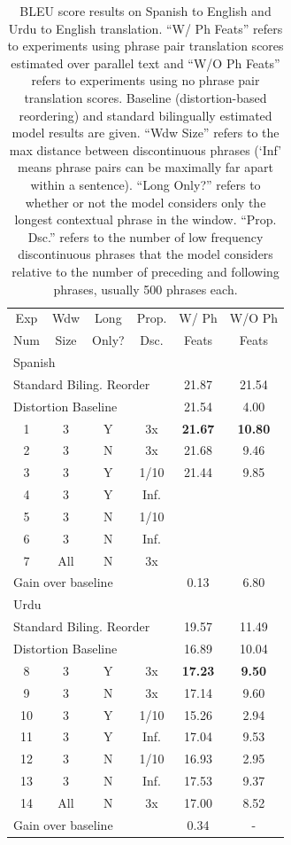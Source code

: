 \documentclass[11pt,letterpaper]{article}
\begin{document}
\begin{table}[t]
\begin{smaller}
\begin{center}
\begin{tabular}{|c|c|c|c|c|c|}
\hline
Exp & Wdw & Long & Prop.  & W/ Ph & W/O Ph \\
Num & Size & Only? &  Dsc. & Feats  & Feats \\
\hline
\multicolumn{6}{|l|}{Spanish} \\
\hline
\multicolumn{4}{|l|}{Standard Biling. Reorder} & 21.87 & 21.54 \\ 
\hline
\multicolumn{4}{|l|}{Distortion Baseline} & 21.54 & 4.00 \\ 
\hline
1 & 3 & Y & 3x & {\bf 21.67} & {\bf 10.80} \\
\hline
2 & 3 & N & 3x & 21.68 & 9.46 \\
3 & 3 & Y & 1/10 & 21.44 & 9.85 \\
4 & 3 & Y & Inf. &  &  \\
5& 3 & N & 1/10 &  &  \\
6& 3 & N & Inf. &  &  \\
7& All & N & 3x &  &  \\
\hline
\multicolumn{4}{|l|}{Gain over baseline} & 0.13 & 6.80 \\ 
\hline
\hline
\multicolumn{6}{|l|}{Urdu} \\
\hline
\multicolumn{4}{|l|}{Standard Biling. Reorder} & 19.57 & 11.49 \\ 
\hline
\multicolumn{4}{|l|}{Distortion Baseline} & 16.89 & 10.04 \\
\hline
8 & 3 & Y & 3x & {\bf 17.23} & {\bf 9.50} \\
\hline
9 & 3 & N & 3x & 17.14 & 9.60 \\
10 & 3 & Y & 1/10 & 15.26 & 2.94 \\
11 & 3 & Y & Inf. & 17.04 & 9.53 \\
12 & 3 & N & 1/10 & 16.93 & 2.95 \\
13 & 3 & N & Inf. & 17.53 & 9.37 \\
14 & All & N & 3x & 17.00 & 8.52 \\
\hline
\multicolumn{4}{|l|}{Gain over baseline} & 0.34 & - \\ 
\hline
\end{tabular}
\end{center}
\vskip -0.1in
\caption{\label{bleu-table}BLEU score results on Spanish to English and Urdu to English translation. ``W/ Ph Feats'' refers to experiments using phrase pair translation scores estimated over parallel text and ``W/O Ph Feats'' refers to experiments using no phrase pair translation scores. Baseline (distortion-based reordering) and standard bilingually estimated model results are given. ``Wdw Size'' refers to the max distance between discontinuous phrases (`Inf' means phrase pairs can be maximally far apart within a sentence). ``Long Only?'' refers to whether or not the model considers only the longest contextual phrase in the window. ``Prop. Dsc.'' refers to the number of low frequency discontinuous phrases that the model considers relative to the number of preceding and following phrases, usually 500 phrases each.}

\end{smaller}
\end{table}
\end{document}
